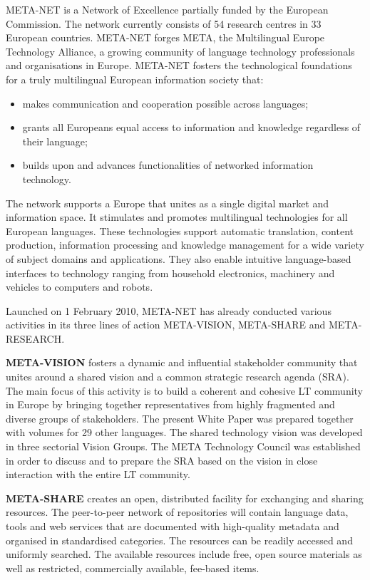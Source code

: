 \begin{multicols}{2}
META-NET is a Network of Excellence partially funded by the European Commission. The network currently consists of 54 research centres in 33 European countries. META-NET forges META, the Multilingual Europe Technology Alliance, a growing community of language technology professionals and organisations in Europe. META-NET fosters the technological foundations for a truly multilingual European information society that: 

\begin{itemize}[itemsep=0pt,parsep=0pt]
\item makes communication and cooperation possible across languages;
\item grants all Europeans equal access to information and knowledge regardless of their language; 
\item builds upon and advances functionalities of networked information technology.
\end{itemize}

The network supports a Europe that unites as a single digital market and information space. It stimulates and promotes multilingual technologies for all European languages. These technologies support automatic translation, content production, information processing and knowledge management for a wide variety of subject domains and applications. They also enable intuitive language-based interfaces to technology ranging from household electronics, machinery and vehicles to computers and robots.

Launched on 1 February 2010, META-NET has already conducted various activities in its three lines of action META-VISION, META-SHARE and META-RESEARCH. 

\textbf{META-VISION} fosters a dynamic and inﬂuential stakeholder community that unites around a shared vision and a common strategic research agenda (SRA). The main focus of this activity is to build a coherent and cohesive LT community in Europe by bringing together representatives from highly fragmented and diverse groups of stakeholders. The present White Paper was prepared together with volumes for 29 other languages. The shared technology vision was developed in three sectorial Vision Groups. The META Technology Council was established in order to discuss and to prepare the SRA based on the vision in close interaction with the entire LT community. 

\textbf{META-SHARE} creates an open, distributed facility for exchanging and sharing resources. The peer-to-peer network of repositories will contain language data, tools and web services that are documented with high-quality metadata and organised in standardised categories. The resources can be readily accessed and uniformly searched. The available resources include free, open source materials as well as restricted, commercially available, fee-based items. 


\end{multicols}
